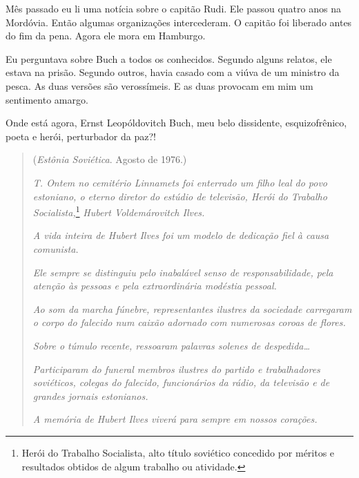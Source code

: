 Mês passado eu li uma notícia sobre o capitão Rudi. Ele passou quatro
anos na Mordóvia. Então algumas organizações intercederam. O
capitão foi liberado antes do fim da pena. Agora ele mora em
Hamburgo.

Eu perguntava sobre Buch a todos os conhecidos. Segundo alguns relatos,
ele estava na prisão. Segundo outros, havia casado com a viúva de um
ministro da pesca. As duas versões são verossímeis. E as duas provocam
em mim um sentimento amargo.

Onde está agora, Ernst Leopóldovitch Buch, meu belo dissidente,
esquizofrênico, poeta e herói, perturbador da paz?!

\movetooddpage
\begin{center}
{}
\end{center}

\begin{quotation}
\begin{flushright}
(\emph{Estônia Soviética}. Agosto de 1976.)
\end{flushright}
\vspace{4pt}
\noindent\emph{T. Ontem no cemitério Linnamets foi
enterrado um filho leal do povo estoniano, o eterno diretor do estúdio
de televisão, Herói do Trabalho Socialista,}\footnote{Herói do Trabalho Socialista, alto
  título soviético concedido por méritos e resultados obti­dos de algum
  trabalho ou atividade.} \emph{Hubert Voldemárovitch Ilves.}

\emph{A vida inteira de Hubert Ilves foi um modelo de dedicação fiel à
causa comunista.}

\emph{Ele sempre se distinguiu pelo inabalável senso de
responsabilidade, pela atenção às pessoas e pela extraordinária modéstia
pessoal.}

\emph{Ao som da marcha fúnebre, representantes ilustres da sociedade
carregaram o corpo do falecido num caixão adornado com numerosas coroas
de flores.}

\emph{Sobre o túmulo recente, ressoaram palavras solenes de
despedida\ldots{}}

\emph{Participaram do funeral membros ilustres do partido e
trabalhadores soviéticos, colegas do falecido, funcionários da rádio, da
televisão e de grandes jornais estonianos.}

\emph{A memória de Hubert Ilves viverá para sempre em nossos corações.}
\end{quotation}

